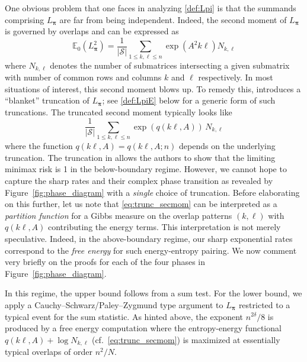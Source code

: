 \documentclass[11pt,reqno,letterpaper]{amsart}
\numberwithin{equation}{section}
\theoremstyle{plain}
\def \bpi{\boldsymbol{\pi}}
\def \E{\mathbb{E}}
\begin{document}
One obvious problem that one faces in analyzing \eqref{def:Lpi} is that the summands 
comprising $L_{\bpi}$ are far from being independent. Indeed, the second moment of 
$L_{\bpi}$ is governed by overlaps and can be expressed as
\begin{equation*}
\E_0(L_{\bpi}^2)  = \frac1{|\mathcal S|} \sum_{1 \le k, \ell \le n} \exp(A^2k\ell) N_{k, \ell}
\end{equation*}
where $N_{k, \ell}$ denotes the number of submatrices intersecting a given submatrix 
with number of common rows and columns $k$ and $\ell$ respectively. In most 
situations of interest, this second moment blows up. To remedy this, 
\cite{butuceasubmatrix2013} introduces a ``blanket'' truncation of $L_{\bpi}$; see 
\eqref{def:LpiE} below for a generic form of such truncations. The truncated second 
moment typically looks like
\begin{equation}\label{eq:trunc_secmom}
\frac1{|\mathcal S|} \sum_{1 \le k, \ell \le n} \exp( q(k\ell, A) ) \, N_{k, \ell}
\end{equation}
where the function $q(k\ell, A) = q(k\ell, A; n)$ depends on the underlying 
truncation. The truncation in \cite{butuceasubmatrix2013} allows the authors to show 
that the limiting minimax risk is 1 in the below-boundary regime. However, we cannot
hope to capture the sharp rates and their complex phase transition as revealed by 
Figure~\ref{fig:phase_diagram} with a {\em single} choice of truncation. Before 
elaborating on this further, let us note that \eqref{eq:trunc_secmom} can be 
interpreted as a {\em partition function} for a Gibbs measure on the overlap 
patterns $(k, \ell)$ with $q(k\ell, A)$ contributing the energy terms. 
This interpretation is not merely speculative. Indeed, in the above-boundary regime, 
our sharp exponential rates correspond to the {\em free energy} for such energy-entropy pairing. We now comment very briefly on the proofs for each of the four 
phases in Figure~\ref{fig:phase_diagram}. 


\vspace{0.15cm}

 In this regime, the upper bound follows 
from a sum test. For the lower bound, we apply a Cauchy--Schwarz/Paley--Zygmund type 
argument to $L_{\bpi}$ restricted to a typical event for the sum statistic. As hinted above, the exponent $n^{2\delta}/8$ is produced by a free energy computation 
where the entropy-energy functional $q(k\ell, A) + \log N_{k, \ell}$ (cf.~\eqref{eq:trunc_secmom}) is maximized at essentially typical overlaps of order 
$n^2/N$.
\end{document}
